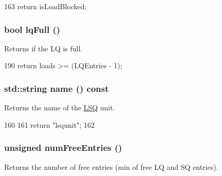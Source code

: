 \begin{DoxyCode}
163     { return isLoadBlocked; }
\end{DoxyCode}
\hypertarget{classOzoneLWLSQ_a5893daf623130be826f492bbff58f757}{
\subsubsection[{lqFull}]{\setlength{\rightskip}{0pt plus 5cm}bool lqFull ()}}
\label{classOzoneLWLSQ_a5893daf623130be826f492bbff58f757}
Returns if the LQ is full. 


\begin{DoxyCode}
190 { return loads >= (LQEntries - 1); }
\end{DoxyCode}
\hypertarget{classOzoneLWLSQ_a37627d5d5bba7f4a8690c71c2ab3cb07}{
\subsubsection[{name}]{\setlength{\rightskip}{0pt plus 5cm}std::string name () const}}
\label{classOzoneLWLSQ_a37627d5d5bba7f4a8690c71c2ab3cb07}
Returns the name of the \hyperlink{classLSQ}{LSQ} unit. 


\begin{DoxyCode}
160 {
161     return "lsqunit";
162 }
\end{DoxyCode}
\hypertarget{classOzoneLWLSQ_a028971a565aca048c67ea1c36a6a9d51}{
\subsubsection[{numFreeEntries}]{\setlength{\rightskip}{0pt plus 5cm}unsigned numFreeEntries ()}}
\label{classOzoneLWLSQ_a028971a565aca048c67ea1c36a6a9d51}
Returns the number of free entries (min of free LQ and SQ entries). 


